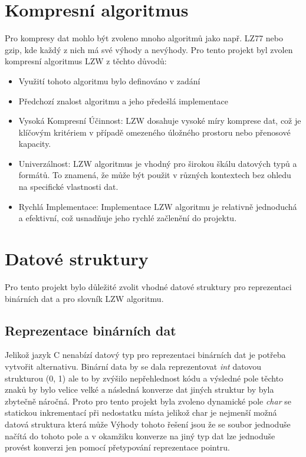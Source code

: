 \documentclass[12pt]{report}
\begin{document}
    \section{Kompresní algoritmus}
    Pro kompresy dat mohlo být zvoleno mnoho algoritmů jako např. LZ77 nebo gzip, kde každý z nich má své výhody a nevýhody. Pro tento projekt byl zvolen kompresní algoritmus LZW z těchto důvodů:
    \begin{itemize}
        \item Využití tohoto algoritmu bylo definováno v zadání
        \item Předchozí znalost algoritmu a jeho předešlá implementace
        \item Vysoká Kompresní Účinnost: LZW dosahuje vysoké míry komprese dat, což je klíčovým kritériem v případě omezeného úložného prostoru nebo přenosové kapacity.
        \item Univerzálnost: LZW algoritmus je vhodný pro širokou škálu datových typů a formátů. To znamená, že může být použit v různých kontextech bez ohledu na specifické vlastnosti dat.
        \item Rychlá Implementace: Implementace LZW algoritmu je relativně jednoduchá a efektivní, což usnadňuje jeho rychlé začlenění do projektu.
    \end{itemize}

    \section{Datové struktury}
    Pro tento projekt bylo důležité zvolit vhodné datové struktury pro reprezentaci binárních dat a pro slovník LZW algoritmu.

    \subsection{Reprezentace binárních dat}
    Jelikož jazyk C nenabízí datový typ pro reprezentaci binárních dat je potřeba vytvořit alternativu. Binární data by se dala reprezentovat \textit{int} datovou strukturou (0, 1) ale to by zvýšilo nepřehlednost kódu a výsledné pole těchto znaků by bylo velice velké a následná konverze dat jiných struktur by byla zbytečně náročná. Proto pro tento projekt byla zvoleno dynamické pole \textit{char} se statickou inkrementací při nedostatku místa jelikož char je nejmenší možná datová struktura která může Výhody tohoto řešení jsou že se soubor jednoduše načítá do tohoto pole a v okamžiku konverze na jiný typ dat lze jednoduše provést konverzi jen pomocí přetypování reprezentace pointru.
\end{document}
